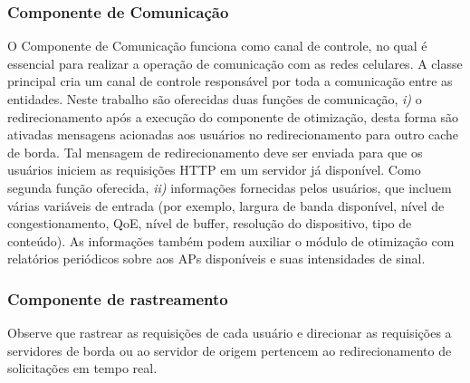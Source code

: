 \subsubsection*{Componente de Comunicação}

O Componente de Comunicação funciona como canal de controle, no qual é essencial para realizar a operação de comunicação com as redes celulares. A classe principal cria um canal de controle responsável por toda a comunicação entre as entidades. Neste trabalho são oferecidas duas funções de comunicação, \textit{i)} o redirecionamento após a execução do componente de otimização, desta forma são ativadas mensagens acionadas aos usuários no redirecionamento para outro cache de borda. Tal mensagem de redirecionamento deve ser enviada para que os usuários iniciem as requisições HTTP em um servidor já disponível. Como segunda função oferecida, \textit{ii)} informações fornecidas pelos usuários, que incluem várias variáveis de entrada (por exemplo, largura de banda disponível, nível de congestionamento, QoE, nível de buffer, resolução do dispositivo, tipo de conteúdo).
As informações também podem auxiliar o módulo de otimização com relatórios periódicos sobre aos APs disponíveis e suas intensidades de sinal.


\subsubsection*{Componente de rastreamento}

Observe que rastrear as requisições de cada usuário e direcionar as requisições a servidores de borda ou ao servidor de origem pertencem ao redirecionamento de solicitações em tempo real.

